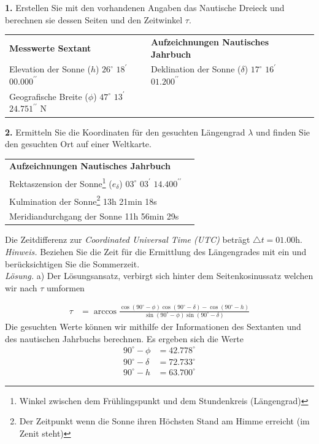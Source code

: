 \begin{refsection}
\textbf{1.} Erstellen Sie mit den vorhandenen Angaben das Nautische Dreieck und berechnen sie dessen Seiten und den Zeitwinkel $\tau$.

\begin{center}
\renewcommand{\arraystretch}{1.5}
\begin{tabular}{llll}
\textbf{Messwerte Sextant} & \textbf{Aufzeichnungen Nautisches Jahrbuch} \\
Elevation der Sonne ($h$) $26^{\circ}$ $18^{\prime}$ $00.000^{\prime \prime}$ & Deklination der Sonne ($\delta$)  $17^{\circ}$ $16^{\prime}$ $01.200^{\prime \prime}$ \\
Geografische Breite ($\phi$) $47^{\circ}$ $13^{\prime}$ $24.751^{\prime \prime}$ N
\end{tabular}
\end{center}


\textbf{2.} Ermitteln Sie die Koordinaten für den gesuchten Längengrad $\lambda$ und finden Sie den gesuchten Ort auf einer Weltkarte.

\begin{center}
\renewcommand{\arraystretch}{1.5}
\begin{tabular}{ll}
\textbf{Aufzeichnungen Nautisches Jahrbuch} \\
Rektaszension der Sonne\footnote{%
Winkel zwischen dem Frühlingspunkt und dem Stundenkreis (Längengrad)} ($e_\delta$) $03^{\circ}$ $03^{\prime}$ $14.400^{\prime \prime}$ \\
Kulmination der Sonne\footnote{%
Der Zeitpunkt wenn die Sonne ihren Höchsten Stand am Himme erreicht (im Zenit steht)} 13h 21min 18s \\
Meridiandurchgang der Sonne 11h 56min 29s
\end{tabular}
\end{center}

Die Zeitdifferenz zur \textit{Coordinated Universal Time (UTC)} beträgt $\triangle{t}=01.00$h. \\

\textit{Hinweis.} Beziehen Sie die Zeit für die Ermittlung des Längengrades mit ein und berücksichtigen Sie die Sommerzeit. \\

\textit{Lösung.} \quad a) Der Lösungsansatz, verbirgt sich hinter dem Seitenkosinussatz welchen wir nach $\tau$ umformen

\begin{align*}
\tau &= \arccos 
\frac{ \cos(90^{\circ} - \phi) \cos(90^{\circ} - \delta) - \cos(90^{\circ} - h)} {\sin(90^{\circ} - \phi)\sin(90^{\circ} - \delta)}
\end{align*}
Die gesuchten Werte können wir mithilfe der Informationen des Sextanten und des nautischen Jahrbuchs berechnen. Es ergeben sich die Werte
\begin{align*}
90^{\circ} - \phi &= 42.778^{\circ}
\\
90^{\circ} - \delta &= 72.733^{\circ}
\\
90^{\circ} - h &= 63.700^{\circ}
\end{align*}


\end{refsection}
